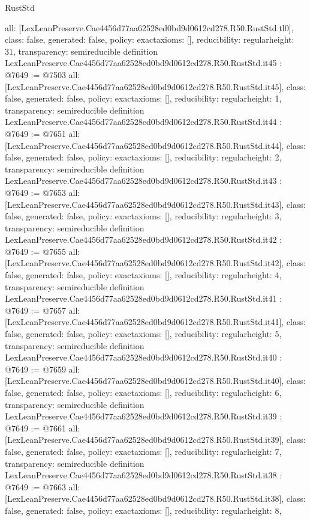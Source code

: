 \begin{lexlean}{RustStd}
\begin{coremodule}
{  all: [LexLeanPreserve.Cae4456d77aa62528ed0bd9d0612cd278.R50.RustStd.tl0],
  class: false,
  generated: false,
  policy: exact{axioms: []},
  reducibility: regular{height: 31},
  transparency: semireducible
}
definition LexLeanPreserve.Cae4456d77aa62528ed0bd9d0612cd278.R50.RustStd.it45 : @7649 := @7503 {
  all: [LexLeanPreserve.Cae4456d77aa62528ed0bd9d0612cd278.R50.RustStd.it45],
  class: false,
  generated: false,
  policy: exact{axioms: []},
  reducibility: regular{height: 1},
  transparency: semireducible
}
definition LexLeanPreserve.Cae4456d77aa62528ed0bd9d0612cd278.R50.RustStd.it44 : @7649 := @7651 {
  all: [LexLeanPreserve.Cae4456d77aa62528ed0bd9d0612cd278.R50.RustStd.it44],
  class: false,
  generated: false,
  policy: exact{axioms: []},
  reducibility: regular{height: 2},
  transparency: semireducible
}
definition LexLeanPreserve.Cae4456d77aa62528ed0bd9d0612cd278.R50.RustStd.it43 : @7649 := @7653 {
  all: [LexLeanPreserve.Cae4456d77aa62528ed0bd9d0612cd278.R50.RustStd.it43],
  class: false,
  generated: false,
  policy: exact{axioms: []},
  reducibility: regular{height: 3},
  transparency: semireducible
}
definition LexLeanPreserve.Cae4456d77aa62528ed0bd9d0612cd278.R50.RustStd.it42 : @7649 := @7655 {
  all: [LexLeanPreserve.Cae4456d77aa62528ed0bd9d0612cd278.R50.RustStd.it42],
  class: false,
  generated: false,
  policy: exact{axioms: []},
  reducibility: regular{height: 4},
  transparency: semireducible
}
definition LexLeanPreserve.Cae4456d77aa62528ed0bd9d0612cd278.R50.RustStd.it41 : @7649 := @7657 {
  all: [LexLeanPreserve.Cae4456d77aa62528ed0bd9d0612cd278.R50.RustStd.it41],
  class: false,
  generated: false,
  policy: exact{axioms: []},
  reducibility: regular{height: 5},
  transparency: semireducible
}
definition LexLeanPreserve.Cae4456d77aa62528ed0bd9d0612cd278.R50.RustStd.it40 : @7649 := @7659 {
  all: [LexLeanPreserve.Cae4456d77aa62528ed0bd9d0612cd278.R50.RustStd.it40],
  class: false,
  generated: false,
  policy: exact{axioms: []},
  reducibility: regular{height: 6},
  transparency: semireducible
}
definition LexLeanPreserve.Cae4456d77aa62528ed0bd9d0612cd278.R50.RustStd.it39 : @7649 := @7661 {
  all: [LexLeanPreserve.Cae4456d77aa62528ed0bd9d0612cd278.R50.RustStd.it39],
  class: false,
  generated: false,
  policy: exact{axioms: []},
  reducibility: regular{height: 7},
  transparency: semireducible
}
definition LexLeanPreserve.Cae4456d77aa62528ed0bd9d0612cd278.R50.RustStd.it38 : @7649 := @7663 {
  all: [LexLeanPreserve.Cae4456d77aa62528ed0bd9d0612cd278.R50.RustStd.it38],
  class: false,
  generated: false,
  policy: exact{axioms: []},
  reducibility: regular{height: 8},
}
\end{coremodule}
\end{lexlean}
